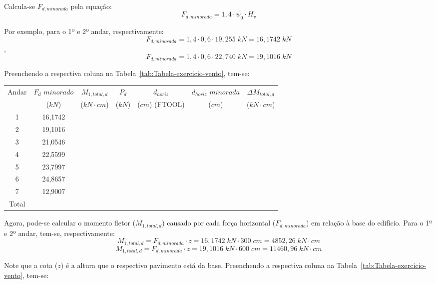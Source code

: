 Calcula-se $F_{d, minorada}$ pela equação:
\begin{equation}F_{d, minorada}=1,4\cdot\psi_0\cdot H_v\end{equation}

Por exemplo, para o 1º e 2º andar, respectivamente: $$F_{d, minorada}=1,4\cdot 0,6\cdot 19,255\;kN=16,1742\;kN$$, $$F_{d, minorada}=1,4\cdot 0,6\cdot 22,740\;kN=19,1016\;kN$$

Preenchendo a respectiva coluna na Tabela~\ref{tab:Tabela-exercicio-vento}, tem-se:

\begin{table}[H]
\centering
\begin{tabular}{c|c|c|ccc|c}
\hline
Andar & $F_d$ $minorado$ & $M_{1, total, d}$ & \multicolumn{1}{c|}{$P_d$} & \multicolumn{1}{c|}{$d_{horiz}$} & $d_{horiz}$ $minorada$ & $\Delta M_{total, d}$ \\
 & ($kN$) & ($kN\cdot cm$) & \multicolumn{1}{c|}{($kN$)} & \multicolumn{1}{c|}{($cm$) (FTOOL)} & ($cm$) & ($kN\cdot cm$) \\ \hline
1 & 16,1742 &  & \multicolumn{1}{c|}{} & \multicolumn{1}{c|}{} &  &  \\
2 & 19,1016 &  & \multicolumn{1}{c|}{} & \multicolumn{1}{c|}{} &  &  \\
3 & 21,0546 &  & \multicolumn{1}{c|}{} & \multicolumn{1}{c|}{} &  &  \\
4 & 22,5599 &  & \multicolumn{1}{c|}{} & \multicolumn{1}{c|}{} &  &  \\
5 & 23,7997 &  & \multicolumn{1}{c|}{} & \multicolumn{1}{c|}{} &  &  \\
6 & 24,8657 &  & \multicolumn{1}{c|}{} & \multicolumn{1}{c|}{} &  &  \\
7 & 12,9007 &  & \multicolumn{1}{c|}{} & \multicolumn{1}{c|}{} &  &  \\ \hline
Total &  &  &  &  &  &  \\ \cline{1-1} \cline{3-3} \cline{7-7} 
\end{tabular}
\end{table}

Agora, pode-se calcular o momento fletor ($M_{1, total, d}$) causado por cada força horizontal ($F_{d, minorada}$) em relação à base do edifício. Para o 1º e 2º andar, tem-se, respectivamente:
$$M_{1, total, d}=F_{d, minorada}\cdot z=16,1742\;kN\cdot 300\;cm=4852,26\;kN\cdot cm$$
$$M_{1, total, d}=F_{d, minorada}\cdot z=19,1016\;kN\cdot 600\;cm=11460,96\;kN\cdot cm$$

Note que a cota ($z$) é a altura que o respectivo pavimento está da base. Preenchendo a respectiva coluna na Tabela~\ref{tab:Tabela-exercicio-vento}, tem-se:

